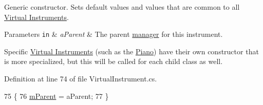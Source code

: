 Generic constructor. Sets default values and values that are common to all \hyperlink{group___v_i}{Virtual Instruments}. 


\begin{DoxyParams}[1]{Parameters}
\mbox{\tt in}  & {\em a\+Parent} & The parent \hyperlink{group___v_i_m}{manager} for this instrument.\\
\hline
\end{DoxyParams}
Specific \hyperlink{group___v_i}{Virtual Instruments} (such as the \hyperlink{class_piano}{Piano}) have their own constructor that is more specialized, but this will be called for each child class as well. 

Definition at line 74 of file Virtual\+Instrument.\+cs.


\begin{DoxyCode}
75     \{
76         \hyperlink{group___v_i_base_pro_var_gae4a87a656d9448cfea28215a6b9c3840}{mParent} = aParent;
77     \}
\end{DoxyCode}
